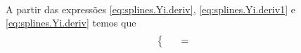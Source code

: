 \documentclass[a4paper,11pt]{article}
\begin{document}
\paragraph{}A partir das expressões \ref{eq:splines.Yi.deriv},
\ref{eq:splines.Yi.deriv1} e \ref{eq:splines.Yi.deriv} temos que 
\begin{equation}
\left\{
\begin{array}{*{13}{c}}
\multicolumn{11}{c}{\ }& $=$ & \ \\
\end{array}
\right.
\end{equation}


\end{document}
